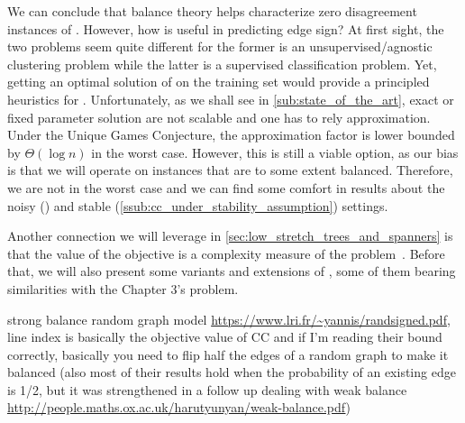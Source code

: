 We can conclude that balance theory helps characterize zero disagreement instances of \pcc{}.
However, how is \pcc{} useful in predicting edge sign? At first sight, the two problems seem quite
different for the former is an unsupervised/agnostic clustering problem while the latter is a
supervised classification problem. Yet, getting an optimal solution of \pcc{} on the training set
would provide a principled heuristics for \esp{}. Unfortunately, as we shall see in
\autoref{sub:state_of_the_art}, exact or fixed parameter solution are not scalable and one has to
rely approximation. Under the Unique Games Conjecture, the approximation factor is lower bounded by
$\Theta(\log n)$ in the worst case. However, this is still a viable option, as our bias is that we
will operate on instances that are to some extent balanced. Therefore, we are not in the worst case
and we can find some comfort in results about the noisy () and
stable (\autoref{ssub:cc_under_stability_assumption}) settings.

Another connection we will leverage in \autoref{sec:low_stretch_trees_and_spanners} is that the
value of the \mind{} objective is a complexity measure of the \esp{} problem~\autocite[Section
4.1]{Cesa-Bianchi2012b}. Before that, we will also present some variants and extensions of \pcc{},
some of them bearing similarities with the Chapter 3's problem.


\iffalse
strong balance random graph model \url{https://www.lri.fr/~yannis/randsigned.pdf}, line index is basically
the objective value of CC and if I'm reading their bound correctly,  basically you need to flip half
the edges of a random graph to make it balanced (also most of their results hold when the
probability of an existing edge is 1/2, but it was strengthened in a follow up dealing with weak
balance \url{http://people.maths.ox.ac.uk/harutyunyan/weak-balance.pdf})

